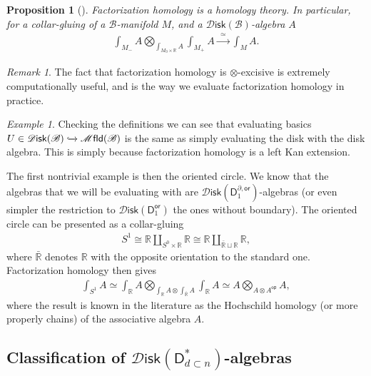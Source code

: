 \documentclass[12pt,a4paper]{article}
\newcounter{counter} \numberwithin{counter}{section}
\theoremstyle{definition}
\theoremstyle{plain}
\newtheorem{proposition}[counter]{Proposition}
\theoremstyle{remark}
\newtheorem{example}[counter]{Example}
\newtheorem{remark}[counter]{Remark}
\newcommand{\mfld}[1][s]{%
    \ifx r#1\mathsf{Mfld}\else
    \ifx s#1\mathscr{M} \mathsf{fld}\else
    \mathrm{Illegal~option}%
    \fi\fi
}
\newcommand{\disk}{\mathscr{D} \mathsf{isk}}
\newcommand{\bstr}{\mathscr{B}}
\begin{document}
\begin{proposition}[{\cite{aft_fhstrat}}]\label{prop:homology=disk_alg}
    Factorization homology is a homology theory. In particular, for a collar-gluing of a $\bstr$-manifold $M$, and a $\disk(\bstr)$-algebra $A$
    \begin{align}
        \int_{M_-} A  \bigotimes\limits_{\int_{M_0 \times \mathbb{R}} A} \int_{M_+} A \xrightarrow{\ \ \simeq \ \ } \int_M A.
    \end{align}
\end{proposition}

\begin{remark}
    The fact that factorization homology is $\otimes$-excisive is extremely computationally useful, and is the way we evaluate factorization homology in practice.
\end{remark}


\begin{example}
    Checking the definitions we can see that evaluating basics $U \in \disk(\bstr) \xhookrightarrow{} \mfld(\bstr)$ is the same as simply evaluating the disk with the disk algebra. This is simply because factorization homology is a left Kan extension.

    The first nontrivial example is then the oriented circle. We know that the algebras that we will be evaluating with are $\disk (\mathsf{D}_1^{\partial, \mathsf{or}})$-algebras (or even simpler the restriction to $\disk (\mathsf{D}_1^{\mathsf{or}})$ the ones without boundary). The oriented circle can be presented as a collar-gluing
    \begin{align}
        S^1 \cong \mathbb{R} \coprod\limits_{S^0 \times \mathbb{R}} \mathbb{R} \cong \mathbb{R} \coprod\limits_{\bar{\mathbb{R}}\sqcup \mathbb{R}} \mathbb{R},
    \end{align}
    where $\bar{\mathbb{R}}$ denotes $\mathbb{R}$ with the opposite orientation to the standard one. Factorization homology then gives
    \begin{align}
        \int_{S^1} A \simeq \int_{\mathbb{R}} A \bigotimes\limits_{\int_{\mathbb{R}} A \otimes \int_{\bar{\mathbb{R}}} A} \int_{\mathbb{R}} A \simeq A \bigotimes\limits_{A \otimes A^{\mathsf{op}}} A,
    \end{align}
    where the result is known in the literature as the Hochschild homology (or more properly chains) of the associative algebra $A$.
\end{example}


\subsection{Classification of \texorpdfstring{$\disk(\mathsf{D}_{d \subset n}^{*})$}{diskdn*}-algebras}
\end{document}
